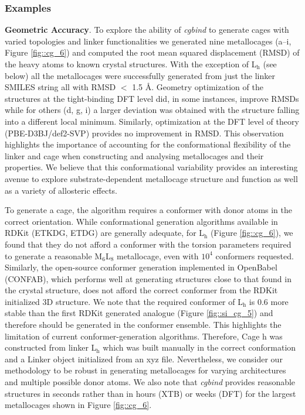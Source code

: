 \documentclass[../../main.tex]{subfiles}
\newcommand{\cgbind}{\emph{cgbind }}
\begin{document}
\subsubsection{Examples}
{\bfseries{Geometric Accuracy}}. To explore the ability of \cgbind to generate cages with varied topologies and linker functionalities we generated nine metallocages (a–i, Figure \ref{fig::cg_6}) and computed the root mean squared displacement (RMSD) of the heavy atoms to known crystal structures. With the exception of L${}_\text{h}$ (see below) all the metallocages were successfully generated from just the linker SMILES string all with RMSD $<$ 1.5 \AA. Geometry optimization of the structures at the tight-binding DFT level did, in some instances, improve RMSDs while for others (d, g, i) a larger deviation was obtained with the structure falling into a different local minimum. Similarly, optimization at the DFT level of theory (PBE-D3BJ/def2-SVP) provides no improvement in RMSD. This observation highlights the importance of accounting for the conformational flexibility of the linker and cage when constructing and analysing metallocages and their properties. We believe that this conformational variability provides an interesting avenue to explore substrate-dependent metallocage structure and function as well as a variety of allosteric effects. 

To generate a cage, the algorithm requires a conformer with donor atoms in the correct orientation. While conformational generation algorithms available in RDKit (ETKDG, ETDG) are generally adequate, for L$_\text{h}$ (Figure \ref{fig::cg_6}), we found that they do not afford a conformer with the torsion parameters required to generate a reasonable M${}_6$L${}_8$ metallocage, even with $10^4$ conformers requested. Similarly, the open-source conformer generation implemented in OpenBabel (CONFAB),\cite{OBoyle2011} which performs well at generating structures close to that found in the crystal structure, does not afford the correct conformer from the RDKit initialized 3D structure.\cite{Ebejer2012} We note that the required conformer of L${}_\text{h}$ is 0.6 \kcalx more stable than the first RDKit generated analogue (Figure \ref{fig::si_cg_5}) and therefore should be generated in the conformer ensemble. This highlights the limitation of current conformer-generation algorithms. Therefore, Cage h was constructed from linker L${}_\text{h}$ which was built manually in the correct conformation and a Linker object initialized from an xyz file. Nevertheless, we consider our methodology to be robust in generating metallocages for varying architectures and multiple possible donor atoms. We also note that \cgbind provides reasonable structures in seconds rather than in hours (XTB) or weeks (DFT) for the largest metallocages shown in Figure \ref{fig::cg_6}.
\end{document}
